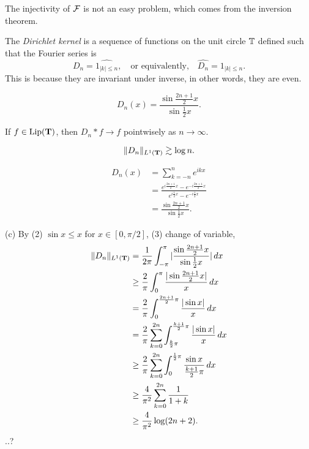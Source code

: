 \documentclass{../../large}
\begin{document}
The injectivity of $\mathcal{F}$ is not an easy problem, which comes from the inversion theorem.



\begin{prb}
The \emph{Dirichlet kernel} is a sequence of functions on the unit circle $\mathbb{T}$ defined such that the Fourier series is 
\[D_n=\hat{1_{|k|\le n}},\quad\text{or equivalently,}\quad\hat{D_n}=1_{|k|\le n}.\]
This is because they are invariant under inverse, in other words, they are even.
\begin{parts}
\item
\[D_n(x)=\frac{\sin\frac{2n+1}2x}{\sin\frac12x}.\]
\item If $f\in\operatorname{Lip}(\mathbf{T})$, then $D_n*f\to f$ pointwisely as $n\to\infty$.
\item
\[\|D_n\|_{L^1(\mathbf{T})}\gtrsim\log n.\]
\end{parts}
\end{prb}

\begin{pf}
\begin{align*}
D_n(x)&=\sum_{k=-n}^ne^{ikx}\\
&=\frac{e^{i\frac{2n+1}2x}-e^{-i\frac{2n+1}2x}}{e^{i\frac12x}-e^{-i\frac12x}}\\
&=\frac{\sin\frac{2n+1}2x}{\sin\frac12x}.
\end{align*}

(c)
By (2) $\sin x\le x$ for $x\in[0,\pi/2]$, (3) change of variable,
\begin{align*}
\|D_n\|_{L^1(\mathbf{T})}
&=\frac1{2\pi}\int_{-\pi}^\pi|\frac{\sin\frac{2n+1}2x}{\sin\frac12x}|\,dx\\
&\ge\frac2\pi\int_0^\pi\frac{|\sin\frac{2n+1}2x|}x\,dx\\
&=\frac2\pi\int_0^{\frac{2n+1}2\pi}\frac{|\sin x|}x\,dx\\
&=\frac2\pi\sum_{k=0}^{2n}\int_{\frac k2\pi}^{\frac{k+1}2\pi}\frac{|\sin x|}x\,dx\\
&\ge\frac2\pi\sum_{k=0}^{2n}\int_0^{\frac12\pi}\frac{\sin x}{\frac{k+1}2\pi}\,dx\\
&\ge\frac4{\pi^2}\sum_{k=0}^{2n}\frac1{1+k}\\
&\ge\frac4{\pi^2}\log(2n+2).
\end{align*}
..?
\end{pf}
\end{document}
